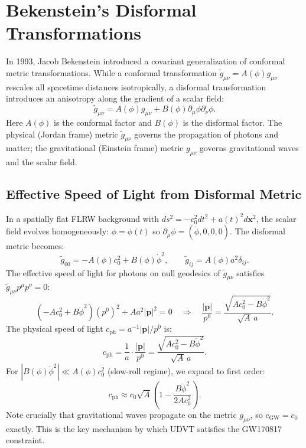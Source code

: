 \documentclass[12pt,a4paper]{book}
\theoremstyle{definition}
\theoremstyle{remark}
\begin{document}
\section{Bekenstein's Disformal Transformations}

In 1993, Jacob Bekenstein introduced a covariant generalization of conformal metric transformations. While a conformal transformation $\tilde{g}_{\mu\nu} = A(\phi)g_{\mu\nu}$ rescales all spacetime distances isotropically, a disformal transformation introduces an anisotropy along the gradient of a scalar field:
\begin{equation}
    \tilde{g}_{\mu\nu} = A(\phi)g_{\mu\nu} + B(\phi)\partial_\mu\phi\partial_\nu\phi.
\end{equation}
Here $A(\phi)$ is the conformal factor and $B(\phi)$ is the disformal factor. The physical (Jordan frame) metric $\tilde{g}_{\mu\nu}$ governs the propagation of photons and matter; the gravitational (Einstein frame) metric $g_{\mu\nu}$ governs gravitational waves and the scalar field.

\subsection{Effective Speed of Light from Disformal Metric}

In a spatially flat FLRW background with $ds^2 = -c_0^2 dt^2 + a(t)^2 d\mathbf{x}^2$, the scalar field evolves homogeneously: $\phi = \phi(t)$ so $\partial_\mu\phi = (\dot{\phi}, 0, 0, 0)$. The disformal metric becomes:
\begin{equation}
    \tilde{g}_{00} = -A(\phi)c_0^2 + B(\phi)\dot{\phi}^2, \qquad \tilde{g}_{ij} = A(\phi)a^2\delta_{ij}.
\end{equation}
The effective speed of light for photons on null geodesics of $\tilde{g}_{\mu\nu}$ satisfies $\tilde{g}_{\mu\nu}p^\mu p^\nu = 0$:
\begin{equation}
    (-Ac_0^2 + B\dot{\phi}^2)(p^0)^2 + Aa^2|\mathbf{p}|^2 = 0 \quad \Rightarrow \quad \frac{|\mathbf{p}|}{p^0} = \frac{\sqrt{Ac_0^2 - B\dot{\phi}^2}}{\sqrt{A}\,a}.
\end{equation}
The physical speed of light $c_{\mathrm{ph}} = a^{-1}|\mathbf{p}|/p^0$ is:
\begin{equation}
    c_{\mathrm{ph}} = \frac{1}{a} \cdot \frac{|\mathbf{p}|}{p^0} = \frac{\sqrt{Ac_0^2 - B\dot{\phi}^2}}{\sqrt{A}\,a}.
\end{equation}
For $|B(\phi)\dot{\phi}^2| \ll A(\phi)c_0^2$ (slow-roll regime), we expand to first order:
\begin{equation}
    c_{\mathrm{ph}} \approx c_0\sqrt{A}\left(1 - \frac{B\dot{\phi}^2}{2Ac_0^2}\right).
\end{equation}
Note crucially that gravitational waves propagate on the metric $g_{\mu\nu}$, so $c_{\mathrm{GW}} = c_0$ exactly. This is the key mechanism by which UDVT satisfies the GW170817 constraint.
\end{document}
